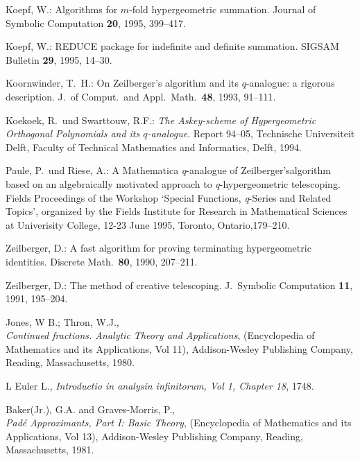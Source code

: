 \begin{thebibliography}{999}
Koepf, W.:
Algorithms for $m$-fold hypergeometric summation.
Journal of Symbolic Computation \textbf{20}, 1995, 399--417.

Koepf, W.:
REDUCE package for indefinite and definite summation.
SIGSAM Bulletin \textbf{29}, 1995, 14--30.

Koornwinder, T.\ H.:
On Zeilberger's algorithm and its $q$-analogue: a rigorous description.
J.\ of Comput.\ and Appl.\ Math.\ \textbf{48}, 1993, 91--111.

Koekoek, R.\ und Swarttouw, R.F.:
{\sl The Askey-scheme of Hypergeometric Orthogonal
Polynomials and its $q$-analogue}. Report 94--05, Tech\-nische Universiteit
Delft, Faculty of Technical Mathematics and Informatics, Delft, 1994.


Paule, P.\ und Riese, A.:
A Mathematica \textsl{q}-analogue of Zeilberger's\linebreak[4]
algorithm based on an
algebraically motivated approach to \textsl{q}-hyper\-geometric telescoping.
Fields Proceedings of the Workshop `Special Functions, \textsl{q}-Series
and Related Topics', organized by the Fields Institute for Research in
Mathematical Sciences at Univerisity College,
12-23 June 1995, Toronto, Ontario,179--210.

Zeilberger, D.:
A fast algorithm for proving terminating hypergeometric identities.
Discrete Math.\ \textbf{80}, 1990, 207--211.

Zeilberger, D.:
The method of creative telescoping.
J.\ Symbolic Computation \textbf{11}, 1991, 195--204.


 Jones, W B.; Thron, W.J., \\
\textit{Continued fractions. Analytic Theory and Applications},
 (Encyclopedia of Mathematics and its Applications, Vol 11),
Addison-Wesley Publishing Company, Reading, Massachusetts, 1980.

 L Euler L., \textit{Introductio in analysin infinitorum, Vol 1,
 Chapter 18}, 1748.

 Baker(Jr.), G.A. and Graves-Morris, P.,\\
\textit{Pad\'{e} Approximants, Part I: Basic Theory},
(Encyclopedia of Mathematics and its Applications, Vol 13),
Addison-Wesley Publishing Company, Reading, Massachusetts, 1981.


\end{thebibliography}
